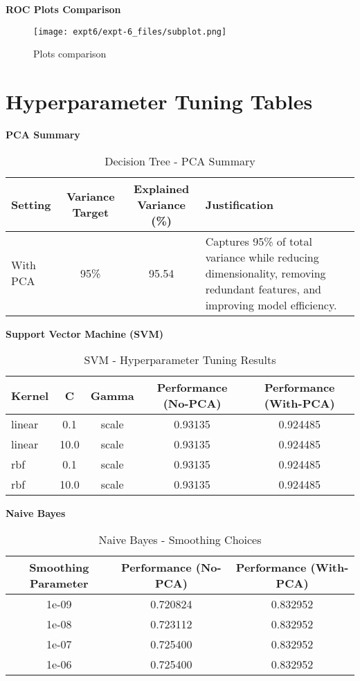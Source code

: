 \documentclass[11pt]{article}
\begin{document}
\textbf{ROC Plots Comparison}
\begin{figure}[H]
\centering
\texttt{[image: expt6/expt-6\_files/subplot.png]} 
\caption{Plots comparison}
\end{figure}

\vspace{0.8cm}
\section{Hyperparameter Tuning Tables}
\vspace{0.5cm}
\textbf{PCA Summary}
\begin{table}[H]
\centering
\caption{Decision Tree - PCA Summary}
\begin{tabular}{|l|c|c|p{4cm}|} 
\hline
\textbf{Setting} & \textbf{Variance Target} & \textbf{Explained Variance (\%)} & \textbf{Justification} \\
\hline
With PCA & 95\% & 95.54 & Captures 95\% of total variance while reducing dimensionality, removing redundant features, and improving model efficiency. \\
\hline
\end{tabular}
\end{table}

\vspace{0.7cm}
\textbf{Support Vector Machine (SVM)}
\begin{table}[H]
\centering
\caption{SVM - Hyperparameter Tuning Results}
\begin{tabular}{|l|c|c|c|c|} 
\hline
\textbf{Kernel} & \textbf{C} & \textbf{Gamma} & \textbf{Performance (No-PCA)} & \textbf{Performance (With-PCA)} \\
\hline
linear & 0.1  & scale & 0.93135 & 0.924485 \\
linear & 10.0 & scale & 0.93135 & 0.924485 \\
rbf    & 0.1  & scale & 0.93135 & 0.924485 \\
rbf    & 10.0 & scale & 0.93135 & 0.924485 \\
\hline
\end{tabular}
\end{table}

\vspace{0.7cm}
\textbf{Naive Bayes}
\begin{table}[H]
\centering
\caption{Naive Bayes - Smoothing Choices}
\begin{tabular}{|c|c|c|} 
\hline
\textbf{Smoothing Parameter} & \textbf{Performance (No-PCA)} & \textbf{Performance (With-PCA)} \\
\hline
1e-09 & 0.720824 & 0.832952 \\
1e-08 & 0.723112 & 0.832952 \\
1e-07 & 0.725400 & 0.832952 \\
1e-06 & 0.725400 & 0.832952 \\
\hline
\end{tabular}
\end{table}
\end{document}
